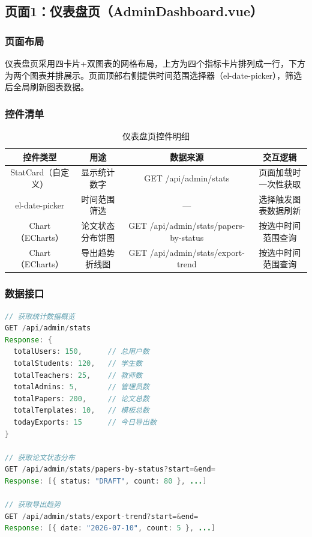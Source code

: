 \documentclass{../../softeng}
\begin{document}
\subsection{页面1：仪表盘页（AdminDashboard.vue）}

\subsubsection{页面布局}
仪表盘页采用四卡片+双图表的网格布局，上方为四个指标卡片排列成一行，下方为两个图表并排展示。页面顶部右侧提供时间范围选择器（el-date-picker），筛选后全局刷新图表数据。

\subsubsection{控件清单}
\begin{table}[htbp]
\centering
\caption{仪表盘页控件明细}
\label{tab:admin_dashboard}
\begin{tabular}{|c|c|c|c|}
\hline
\textbf{控件类型} & \textbf{用途} & \textbf{数据来源} & \textbf{交互逻辑} \\
\hline
StatCard（自定义） & 显示统计数字 & GET /api/admin/stats & 页面加载时一次性获取 \\
\hline
el-date-picker & 时间范围筛选 & — & 选择触发图表数据刷新 \\
\hline
Chart（ECharts） & 论文状态分布饼图 & GET /api/admin/stats/papers-by-status & 按选中时间范围查询 \\
\hline
Chart（ECharts） & 导出趋势折线图 & GET /api/admin/stats/export-trend & 按选中时间范围查询 \\
\hline
\end{tabular}
\end{table}

\subsubsection{数据接口}
\begin{lstlisting}[language=Java,caption={仪表盘数据接口定义}]
// 获取统计数据概览
GET /api/admin/stats
Response: {
  totalUsers: 150,      // 总用户数
  totalStudents: 120,   // 学生数
  totalTeachers: 25,    // 教师数
  totalAdmins: 5,       // 管理员数
  totalPapers: 200,     // 论文总数
  totalTemplates: 10,   // 模板总数
  todayExports: 15      // 今日导出数
}

// 获取论文状态分布
GET /api/admin/stats/papers-by-status?start=&end=
Response: [{ status: "DRAFT", count: 80 }, ...]

// 获取导出趋势
GET /api/admin/stats/export-trend?start=&end=
Response: [{ date: "2026-07-10", count: 5 }, ...]
\end{lstlisting}
\end{document}
